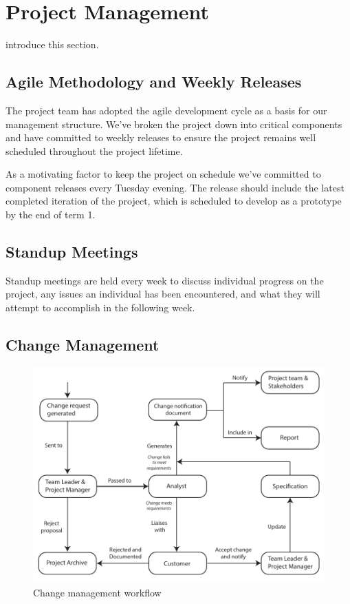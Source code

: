 \chapter[Project Management]{Project Management}
\label{ch:management}


 introduce this section.





\section{Agile Methodology and Weekly Releases}
The project team has adopted the agile development cycle as a basis for our management structure. We've broken the project down into critical components and have committed to weekly releases to ensure the project remains well scheduled throughout the project lifetime.

As a motivating factor to keep the project on schedule we've committed to component releases every Tuesday evening. The release should include the latest completed iteration of the project, which is scheduled to develop as a prototype by the end of term 1.

\section{Standup Meetings}
Standup meetings are held every week to discuss individual progress on the project, any issues an individual has been encountered, and what they will attempt to accomplish in the following week.

\section{Change Management}
\begin{figure}[h!]
\includegraphics{"res/Change management diagram"}
\caption{Change management workflow}
\end{figure}
